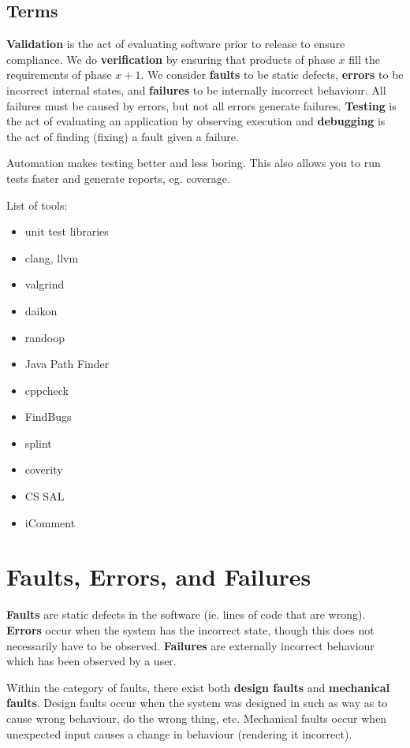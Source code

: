 \documentclass[12pt]{article}
\begin{document}
\subsection{Terms}
{\bf Validation} is the act of evaluating software prior to release to ensure compliance. We do {\bf verification} by ensuring that products of phase $x$ fill the requirements of phase $x+1$. We consider {\bf faults} to be static defects, {\bf errors} to be incorrect internal states, and {\bf failures} to be internally incorrect behaviour. All failures must be caused by errors, but not all errors generate failures. {\bf Testing} is the act of evaluating an application by observing execution and {\bf debugging} is the act of finding (fixing) a fault given a failure.

Automation makes testing better and less boring. This also allows you to run tests faster and generate reports, eg. coverage.

List of tools:
\begin{itemize}
\item unit test libraries
\item clang, llvm
\item valgrind
\item daikon
\item randoop
\item Java Path Finder
\item cppcheck
\item FindBugs
\item splint
\item coverity
\item CS SAL
\item iComment
\end{itemize}

\section{Faults, Errors, and Failures}
{\bf Faults} are static defects in the software (ie. lines of code that are wrong). {\bf Errors} occur when the system has the incorrect state, though this does not necessarily have to be observed. {\bf Failures} are externally incorrect behaviour which has been observed by a user.

Within the category of faults, there exist both {\bf design faults} and {\bf mechanical faults}. Design faults occur when the system was designed in such as way as to cause wrong behaviour, do the wrong thing, etc. Mechanical faults occur when unexpected input causes a change in behaviour (rendering it incorrect).
\end{document}
